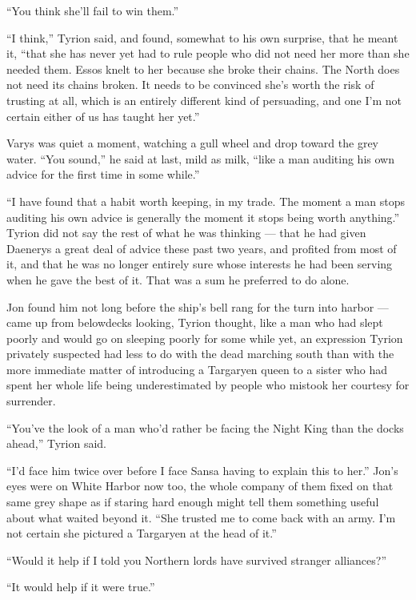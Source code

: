 “You think she’ll fail to win them.”

“I think,” Tyrion said, and found, somewhat to his own surprise, that he meant it, “that she has never yet had to rule people who did not need her more than she needed them. Essos knelt to her because she broke their chains. The North does not need its chains broken. It needs to be convinced she’s worth the risk of trusting at all, which is an entirely different kind of persuading, and one I’m not certain either of us has taught her yet.”

Varys was quiet a moment, watching a gull wheel and drop toward the grey water. “You sound,” he said at last, mild as milk, “like a man auditing his own advice for the first time in some while.”

“I have found that a habit worth keeping, in my trade. The moment a man stops auditing his own advice is generally the moment it stops being worth anything.” Tyrion did not say the rest of what he was thinking — that he had given Daenerys a great deal of advice these past two years, and profited from most of it, and that he was no longer entirely sure whose interests he had been serving when he gave the best of it. That was a sum he preferred to do alone.

\sceneBreak

Jon found him not long before the ship’s bell rang for the turn into harbor — came up from belowdecks looking, Tyrion thought, like a man who had slept poorly and would go on sleeping poorly for some while yet, an expression Tyrion privately suspected had less to do with the dead marching south than with the more immediate matter of introducing a Targaryen queen to a sister who had spent her whole life being underestimated by people who mistook her courtesy for surrender.

“You’ve the look of a man who’d rather be facing the Night King than the docks ahead,” Tyrion said.

“I’d face him twice over before I face Sansa having to explain this to her.” Jon’s eyes were on White Harbor now too, the whole company of them fixed on that same grey shape as if staring hard enough might tell them something useful about what waited beyond it. “She trusted me to come back with an army. I’m not certain she pictured a Targaryen at the head of it.”

“Would it help if I told you Northern lords have survived stranger alliances?”

“It would help if it were true.”

